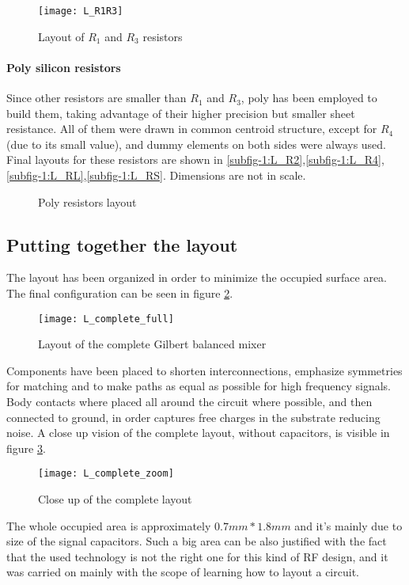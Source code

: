 \begin{figure}[H]
	\centering
	\texttt{[image: L\_R1R3]}
	\caption{Layout of $R_1$ and $R_3$ resistors}
	\label{L_R1R3}
\end{figure}

\paragraph{Poly silicon resistors}
Since other resistors are smaller than \(R_1\) and \(R_3\), poly has been employed to build them, taking advantage of their higher precision but smaller sheet resistance. All of them were drawn in common centroid structure, except for \(R_4\) (due to its small value), and dummy elements on both sides were always used. Final layouts for these resistors are shown in \ref{subfig-1:L_R2},\ref{subfig-1:L_R4},\ref{subfig-1:L_RL},\ref{subfig-1:L_RS}. Dimensions are not in scale.

\begin{figure}[H]
	\centering
	
	\vfill
	\hfil
	\caption{Poly resistors layout}
\end{figure}

\subsection{Putting together the layout}
The layout has been organized in order to minimize the occupied surface area. The final configuration can be seen in figure \ref{L_complete_full}. 
\begin{figure}[H]
	\centering
	\texttt{[image: L\_complete\_full]}
	\caption{Layout of the complete Gilbert balanced mixer}
	\label{L_complete_full}
\end{figure}
Components have been placed to shorten interconnections, emphasize symmetries for matching and to make paths as equal as possible for high frequency signals.
Body contacts where placed all around the circuit where possible, and then connected to ground, in order captures free charges in the substrate reducing noise. A close up vision of the complete layout, without capacitors, is visible in figure \ref{L_complete_zoom}.

\begin{figure}[H]
	\centering
	\texttt{[image: L\_complete\_zoom]}
	\caption{Close up of the complete layout}
	\label{L_complete_zoom}
\end{figure}

The whole occupied area is approximately \(0.7mm*1.8mm\) and it's mainly due to size of the signal capacitors. Such a big area can be also justified with the fact that the used technology is not the right one for this kind of RF design, and it was carried on mainly with the scope of learning how to layout a circuit.
